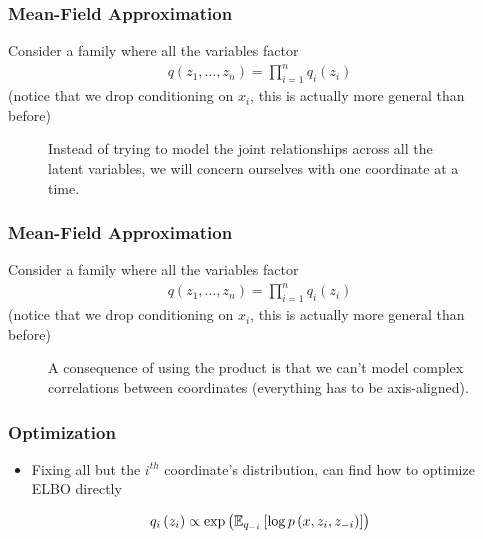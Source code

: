 \documentclass[10pt,mathserif]{beamer}
\begin{document}
\begin{frame}
  \frametitle{Mean-Field Approximation}
  Consider a family where all the variables factor
  \begin{align*}
    q\left(z_1, \dots, z_n\right) = \prod_{i = 1}^{n} q_{i}\left(z_i\right)
  \end{align*}
  (notice that we drop conditioning on $x_i$, this is actually more general than
  before)
\begin{figure}[ht]
  \centering
  \begin{subfigure}
    \texttt{[image: figure/variational\_multidimensional\_q]}
  \end{subfigure}
  \begin{subfigure}
    \texttt{[image: figure/variational\_univariate\_q]}
  \end{subfigure}
  \caption{Instead of trying to model the joint relationships across all the
    latent variables, we will concern ourselves with one coordinate at a
    time. \label{fig:variational_multidimensional_q}}
\end{figure}
\end{frame}

\begin{frame}
  \frametitle{Mean-Field Approximation}
  Consider a family where all the variables factor
  \begin{align*}
    q\left(z_1, \dots, z_n\right) = \prod_{i = 1}^{n} q_{i}\left(z_i\right)
  \end{align*}
  (notice that we drop conditioning on $x_i$, this is actually more general than
  before)
\begin{figure}[ht]
  \centering
  \begin{subfigure}
    \texttt{[image: figure/variational\_multidimensional\_q]}
  \end{subfigure}
  \begin{subfigure}
    \texttt{[image: figure/variational\_product\_q]}
  \end{subfigure}
  \caption{A consequence of using the product is that we can't model complex correlations between coordinates (everything has to be axis-aligned).
    \label{fig:variational_product_q}}
\end{figure}
\end{frame}

\begin{frame}
  \frametitle{Optimization}
  \begin{itemize}
  \item Fixing all but the $i^{th}$ coordinate's distribution, can find how to
    optimize ELBO directly
  \end{itemize}
  \begin{align*}
q_i\left(z_i\right) \propto \operatorname{exp}\left(\mathbb{E}_{q_{-i}}\left[{\log p\left(x, z_i, z_{-i}\right)}\right]\right)
  \end{align*}
\end{frame}
\end{document}
